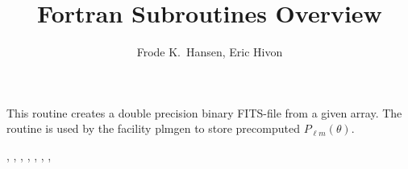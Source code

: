 
\sloppy


\title{\healpix Fortran Subroutines Overview}
 \section[write\_plm]{ }
\label{sub:write_plm}
\author{Frode K.~Hansen, Eric Hivon}

\begin{facility}
{This routine creates a double precision binary FITS-file from a given array. The routine is used by the \healpix facility plmgen to store precomputed $P_{\ell m}(\theta)$.}
{\modFitstools}
\end{facility}

\begin{f90format}
{%
, %
, %
, %
, %
, %
, %
, %
}
\end{f90format}

